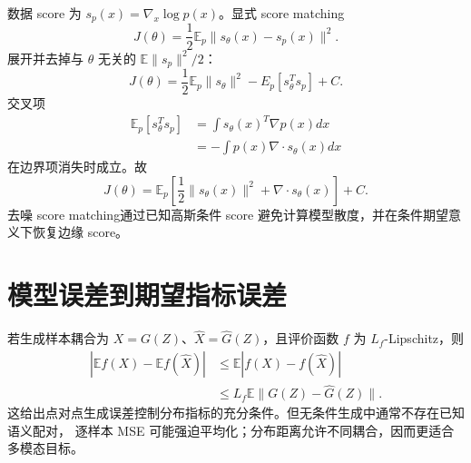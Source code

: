 \documentclass[11pt]{article}
\numberwithin{equation}{section}
\newcommand{\E}{\mathbb{E}}
\newcommand{\1}{\mathbf{1}}
\begin{document}
数据 score 为 $s_p(x)=\nabla_x\log p(x)$。显式 score matching
\begin{equation}
 J(\theta)=\frac12\E_p\|s_\theta(x)-s_p(x)\|^2.
\end{equation}
展开并去掉与 $\theta$ 无关的 $\E\|s_p\|^2/2$：
\begin{equation}
 J(\theta)=\frac12\E_p\|s_\theta\|^2-E_p[s_\theta^Ts_p]+C.
\end{equation}
交叉项
\begin{align}
 \E_p[s_\theta^Ts_p]
 &=\int s_\theta(x)^T\nabla p(x)dx\\
 &=-\int p(x)\nabla\cdot s_\theta(x)dx
\end{align}
在边界项消失时成立。故
\begin{equation}
 J(\theta)=\E_p\left[
 \frac12\|s_\theta(x)\|^2+\nabla\cdot s_\theta(x)
 \right]+C.
\end{equation}
去噪 score matching通过已知高斯条件 score 避免计算模型散度，并在条件期望意义下恢复边缘 score。

\section{模型误差到期望指标误差}

若生成样本耦合为 $X=G(Z)$、$\widehat X=\widehat G(Z)$，且评价函数
$f$ 为 $L_f$-Lipschitz，则
\begin{align}
 |\E f(X)-\E f(\widehat X)|
 &\le\E|f(X)-f(\widehat X)|\\
 &\le L_f\E\|G(Z)-\widehat G(Z)\|.
\end{align}
这给出点对点生成误差控制分布指标的充分条件。但无条件生成中通常不存在已知语义配对，
逐样本 MSE 可能强迫平均化；分布距离允许不同耦合，因而更适合多模态目标。
\end{document}
